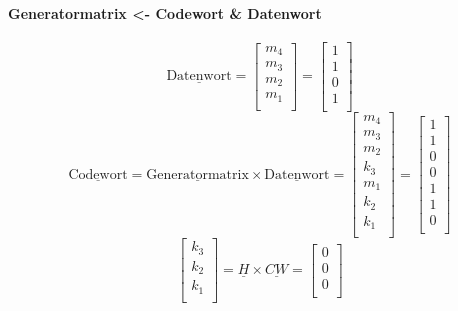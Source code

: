 \documentclass[a4paper]{scrartcl}
\begin{document}
				\paragraph{Generatormatrix <- Codewort \& Datenwort}
					\[
						\underline{\text{Datenwort}} = 
						\begin{bmatrix}
							m_4\\
							m_3\\
							m_2\\
							m_1\\
						\end{bmatrix}
						=
						\begin{bmatrix}
							1\\
							1\\
							0\\
							1\\
						\end{bmatrix}
					\]
					\[
						\underline{\text{Codewort}} = \underline{\text{Generatormatrix}} \times \underline{\text{Datenwort}}=
						\begin{bmatrix}
							m_4\\
							m_3\\
							m_2\\
							k_3\\
							m_1\\
							k_2\\
							k_1\\
						\end{bmatrix}
						=
						\begin{bmatrix}
							1\\
							1\\
							0\\
							0\\
							1\\
							1\\
							0\\
						\end{bmatrix}
					\]
					\[
						\begin{bmatrix}
							k_3\\
							k_2\\
							k_1\\
						\end{bmatrix}
						= \underline{H} \times \underline{CW} = 
						\begin{bmatrix}
							0\\
							0\\
							0\\
						\end{bmatrix}
					\]
					
\end{document}
